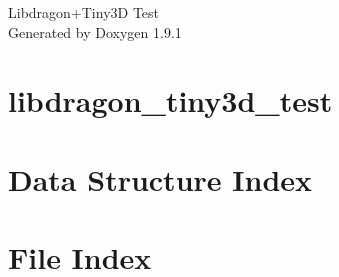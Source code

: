 \let\mypdfximage\pdfximage\def\pdfximage{\immediate\mypdfximage}\documentclass[twoside]{book}
\newcommand{\+}{\discretionary{\mbox{\scriptsize$\hookleftarrow$}}{}{}}
\newcommand{\clearemptydoublepage}{%
  \newpage{\pagestyle{empty}\cleardoublepage}%
}
\begin{document}
\raggedbottom

\hypersetup{pageanchor=false,
             bookmarksnumbered=true,
             pdfencoding=unicode
            }
\begin{titlepage}
\vspace*{7cm}
\begin{center}%
{\Large Libdragon+\+Tiny3D Test }\\
\vspace*{1cm}
{\large Generated by Doxygen 1.9.1}\\
\end{center}
\end{titlepage}
\clearemptydoublepage
{}
\tableofcontents
\clearemptydoublepage
{}
\hypersetup{pageanchor=true}

\chapter{libdragon\+\_\+tiny3d\+\_\+test}
\label{md_README}

\chapter{Data Structure Index}

\chapter{File Index}

\end{document}
